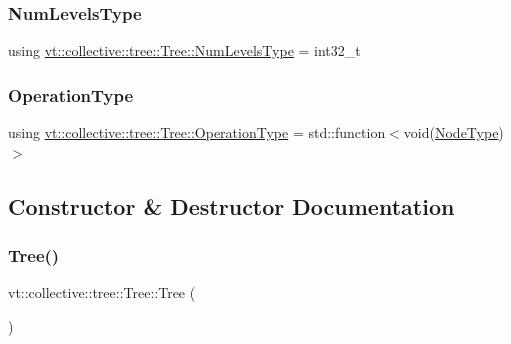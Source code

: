 \subsubsection{\texorpdfstring{Num\+Levels\+Type}{NumLevelsType}}
{\footnotesize\ttfamily using \hyperlink{structvt_1_1collective_1_1tree_1_1_tree_af64acc9543dc1bd1b56d6ed17b003425}{vt\+::collective\+::tree\+::\+Tree\+::\+Num\+Levels\+Type} =  int32\+\_\+t}

\mbox{\label{structvt_1_1collective_1_1tree_1_1_tree_a5ce4242e9580c807baa74168401f381a}} 
\subsubsection{\texorpdfstring{Operation\+Type}{OperationType}}
{\footnotesize\ttfamily using \hyperlink{structvt_1_1collective_1_1tree_1_1_tree_a5ce4242e9580c807baa74168401f381a}{vt\+::collective\+::tree\+::\+Tree\+::\+Operation\+Type} =  std\+::function$<$void(\hyperlink{namespacevt_a866da9d0efc19c0a1ce79e9e492f47e2}{Node\+Type})$>$}



\subsection{Constructor \& Destructor Documentation}
\mbox{\label{structvt_1_1collective_1_1tree_1_1_tree_ae9570e9a8f303295744e99b527603a51}} 
\subsubsection{\texorpdfstring{Tree()}{Tree()}\hspace{0.1cm}{\footnotesize\ttfamily [1/3]}}
{\footnotesize\ttfamily vt\+::collective\+::tree\+::\+Tree\+::\+Tree (\begin{DoxyParamCaption}\item[{Default\+Tree\+Construct\+Tag}]{ }\end{DoxyParamCaption})\hspace{0.3cm}{\ttfamily [explicit]}}

